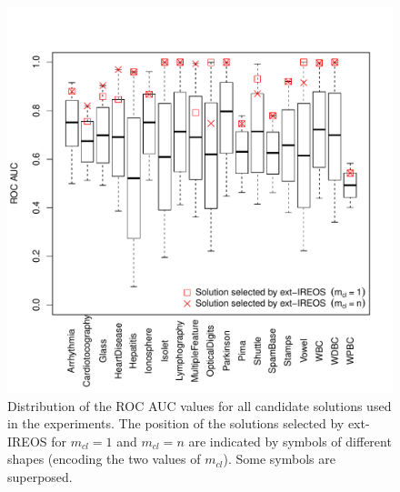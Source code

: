 \begin{figure}[ht!]
\center
\includegraphics[width=\textwidth]{figs/boxplot.pdf}
\captionsetup{justification=centering}
\caption{Distribution of the ROC AUC values for all candidate solutions used in the experiments. The position of the solutions selected by ext-IREOS for $m_{cl} = 1$ and $m_{cl} = n$ are indicated by symbols of different shapes (encoding the two values of $m_{cl}$). Some symbols are superposed.}
\label{fig:boxplot}
\end{figure}

\newpage
